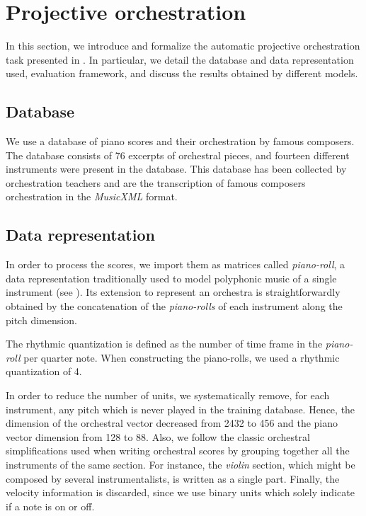 \documentclass[letterpaper]{article}
\begin{document}
\section{Projective orchestration}
In this section, we introduce and formalize the automatic projective orchestration task presented in . In particular, we detail the database and data representation used, evaluation framework, and discuss the results obtained by different models.

\subsection{Database}
We use a database of piano scores and their orchestration by famous composers. The database consists of 76 excerpts of orchestral pieces, and fourteen different instruments were present in the database. This database has been collected by orchestration teachers and are the transcription of famous composers orchestration in the \textit{MusicXML} format.

\subsection{Data representation}
In order to process the scores, we import them as matrices called \textit{piano-roll}, a data representation traditionally used to model polyphonic music of a single instrument (see ). 
Its extension to represent an orchestra is straightforwardly obtained by the concatenation of the \textit{piano-rolls} of each instrument along the pitch dimension.

The rhythmic quantization is defined as the number of time frame in the \textit{piano-roll} per quarter note. When constructing the piano-rolls, we used a rhythmic quantization of 4.

In order to reduce the number of units, we systematically remove, for each instrument, any pitch which is never played in the training database. Hence, the dimension of the orchestral vector decreased from 2432 to 456 and the piano vector dimension from 128 to 88.
Also, we follow the classic orchestral simplifications used when writing orchestral scores by grouping together all the instruments of the same section. For instance, the \textit{violin} section, which might be composed by several instrumentalists, is written as a single part.
Finally, the velocity information is discarded, since we use binary units which solely indicate if a note is on or off.
\end{document}
